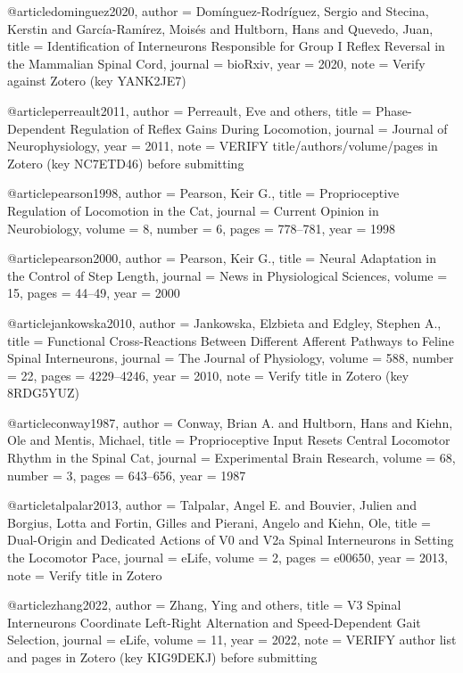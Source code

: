 @article{dominguez2020,
  author  = {Dom{\'i}nguez-Rodr{\'i}guez, Sergio and Stecina, Kerstin and Garc{\'i}a-Ram{\'i}rez, Mois{\'e}s and Hultborn, Hans and Quevedo, Juan},
  title   = {Identification of Interneurons Responsible for Group I Reflex Reversal in the Mammalian Spinal Cord},
  journal = {bioRxiv},
  year    = {2020},
  note    = {Verify against Zotero (key YANK2JE7)}
}

@article{perreault2011,
  author  = {Perreault, Eve and others},
  title   = {Phase-Dependent Regulation of Reflex Gains During Locomotion},
  journal = {Journal of Neurophysiology},
  year    = {2011},
  note    = {VERIFY title/authors/volume/pages in Zotero (key NC7ETD46) before submitting}
}

@article{pearson1998,
  author  = {Pearson, Keir G.},
  title   = {Proprioceptive Regulation of Locomotion in the Cat},
  journal = {Current Opinion in Neurobiology},
  volume  = {8},
  number  = {6},
  pages   = {778--781},
  year    = {1998}
}

@article{pearson2000,
  author  = {Pearson, Keir G.},
  title   = {Neural Adaptation in the Control of Step Length},
  journal = {News in Physiological Sciences},
  volume  = {15},
  pages   = {44--49},
  year    = {2000}
}

@article{jankowska2010,
  author  = {Jankowska, Elzbieta and Edgley, Stephen A.},
  title   = {Functional Cross-Reactions Between Different Afferent Pathways to Feline Spinal Interneurons},
  journal = {The Journal of Physiology},
  volume  = {588},
  number  = {22},
  pages   = {4229--4246},
  year    = {2010},
  note    = {Verify title in Zotero (key 8RDG5YUZ)}
}

@article{conway1987,
  author  = {Conway, Brian A. and Hultborn, Hans and Kiehn, Ole and Mentis, Michael},
  title   = {Proprioceptive Input Resets Central Locomotor Rhythm in the Spinal Cat},
  journal = {Experimental Brain Research},
  volume  = {68},
  number  = {3},
  pages   = {643--656},
  year    = {1987}
}

@article{talpalar2013,
  author  = {Talpalar, Angel E. and Bouvier, Julien and Borgius, Lotta and Fortin, Gilles and Pierani, Angelo and Kiehn, Ole},
  title   = {Dual-Origin and Dedicated Actions of V0 and V2a Spinal Interneurons in Setting the Locomotor Pace},
  journal = {eLife},
  volume  = {2},
  pages   = {e00650},
  year    = {2013},
  note    = {Verify title in Zotero}
}

@article{zhang2022,
  author  = {Zhang, Ying and others},
  title   = {V3 Spinal Interneurons Coordinate Left-Right Alternation and Speed-Dependent Gait Selection},
  journal = {eLife},
  volume  = {11},
  year    = {2022},
  note    = {VERIFY author list and pages in Zotero (key KIG9DEKJ) before submitting}
}

